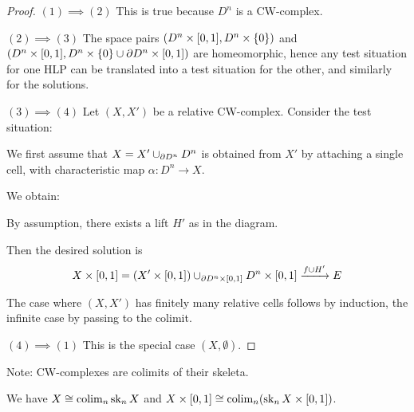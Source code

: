 \begin{proof}

$(1)\implies(2)$ This is true because $D^n$ is a CW-complex.

$(2)\implies(3)$ The space pairs $(D^n\times[0,1],D^n\times\{0\})$ and $(D^n\times[0,1],D^n\times\{0\}\cup\partial D^n\times[0,1])$ are homeomorphic, hence any test situation for one HLP can be translated into a test situation for the other, and similarly for the solutions.

$(3)\implies(4)$ Let $(X,X')$ be a relative CW-complex. Consider the test situation:
\begin{center}
\end{center}

We first assume that $X=X'\cup_{\partial D^n}D^n$ is obtained from $X'$ by attaching a single cell, with characteristic map $\alpha:D^n\to X$.

We obtain:

\begin{center}
\end{center}

By assumption, there exists a lift $H'$ as in the diagram.

Then the desired solution is
\[X\times[0,1]=(X'\times[0,1])\cup_{\partial D^n\times[0,1]}D^n\times[0,1]\xrightarrow{f\cup H'}E\]

The case where $(X,X')$ has finitely many relative cells follows by induction, the infinite case by passing to the colimit.

$(4)\implies(1)$ This is the special case $(X,\emptyset)$.

\end{proof}

\begin{remark}
Note: CW-complexes are colimits of their skeleta.

\begin{center}
\end{center}

We have $X\cong\operatorname*{colim}_n\operatorname{sk}_n X$ and $X\times[0,1]\cong\operatorname*{colim}_n(\operatorname{sk}_n X\times[0,1])$.
\end{remark}

